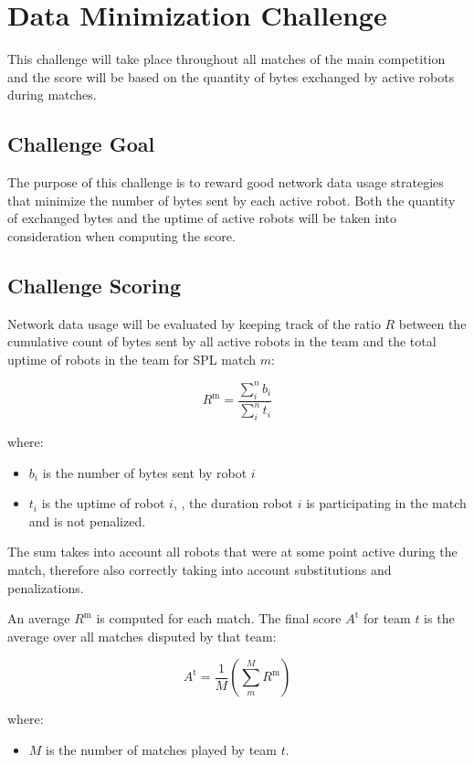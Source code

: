 \section{Data Minimization Challenge} %
This challenge will take place throughout all matches of the main competition and the score will be based on the quantity of bytes exchanged by active robots during matches. 


\subsection{Challenge Goal}
The purpose of this challenge is to reward good network data usage strategies that minimize the number of bytes sent by each active robot. Both the quantity of exchanged bytes and the uptime of active robots will be taken into consideration when computing the score.

\subsection{Challenge Scoring}
Network data usage will be evaluated by keeping track of the ratio $R$ between the cumulative count of bytes sent by all active robots in the team and the total uptime of robots in the team for SPL match $m$:

$$ R^\text{m} = \frac{\sum_{i}^n b_i}{\sum_{i}^n t_i} $$

where:
\begin{itemize}
    \item $b_i$ is the number of bytes sent by robot $i$
    \item $t_i$ is the uptime of robot $i$, \ie, the duration robot $i$ is participating in the match and is not penalized.
\end{itemize}
The sum takes into account all robots that were at some point active during the match, therefore also correctly taking into account substitutions and penalizations.

An average $R^\text{m}$ is computed for each match. The final score $A^\text{t}$ for team $t$ is the average over all matches disputed by that team:

$$ A^\text{t} = \frac{1}{M} \left( \sum_{m}^M R^\text{m} \right) $$

where:
\begin{itemize}
    \item $M$ is the number of matches played by team $t$.
\end{itemize}


